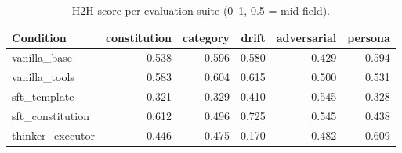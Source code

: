 \begin{table}[htbp]
  \centering
  \caption{H2H score per evaluation suite (0--1, 0.5 = mid-field).}
  \label{tab:rank-by-suite}
  \begin{tabular}{lrrrrr}
    \toprule
    Condition & constitution & category & drift & adversarial & persona \\
    \midrule
    vanilla\_base & 0.538 & 0.596 & 0.580 & 0.429 & 0.594 \\
    vanilla\_tools & 0.583 & 0.604 & 0.615 & 0.500 & 0.531 \\
    sft\_template & 0.321 & 0.329 & 0.410 & 0.545 & 0.328 \\
    sft\_constitution & 0.612 & 0.496 & 0.725 & 0.545 & 0.438 \\
    thinker\_executor & 0.446 & 0.475 & 0.170 & 0.482 & 0.609 \\
    \bottomrule
  \end{tabular}
\end{table}
